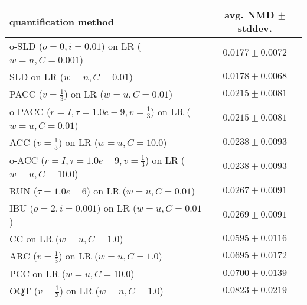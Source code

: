 \begin{tabular}{lc}
  \toprule
  quantification method & avg. NMD $\pm$ stddev. \\
  \midrule
  o-SLD ($o=0, i=0.01$) on LR ($w=n, C=0.001$) & $\mathbf{0.0177 \pm 0.0072}$ \\
  SLD on LR ($w=n, C=0.01$) & $0.0178 \pm 0.0068$ \\
  PACC ($v=\frac{1}{3}$) on LR ($w=u, C=0.01$) & $0.0215 \pm 0.0081$ \\
  o-PACC ($r=I, \tau=1.0e-9, v=\frac{1}{3}$) on LR ($w=u, C=0.01$) & $0.0215 \pm 0.0081$ \\
  ACC ($v=\frac{1}{3}$) on LR ($w=u, C=10.0$) & $0.0238 \pm 0.0093$ \\
  o-ACC ($r=I, \tau=1.0e-9, v=\frac{1}{3}$) on LR ($w=u, C=10.0$) & $0.0238 \pm 0.0093$ \\
  RUN ($\tau=1.0e-6$) on LR ($w=u, C=0.01$) & $0.0267 \pm 0.0091$ \\
  IBU ($o=2, i=0.001$) on LR ($w=u, C=0.01$) & $0.0269 \pm 0.0091$ \\
  CC on LR ($w=u, C=1.0$) & $0.0595 \pm 0.0116$ \\
  ARC ($v=\frac{1}{3}$) on LR ($w=u, C=1.0$) & $0.0695 \pm 0.0172$ \\
  PCC on LR ($w=u, C=10.0$) & $0.0700 \pm 0.0139$ \\
  OQT ($v=\frac{1}{3}$) on LR ($w=n, C=1.0$) & $0.0823 \pm 0.0219$ \\
  \bottomrule
\end{tabular}
